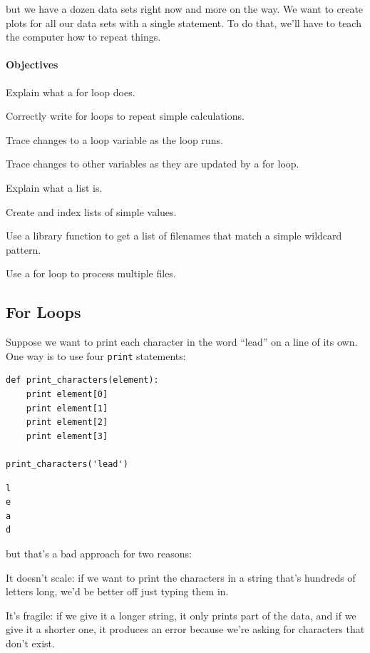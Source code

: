 \documentclass{book}
\begin{document}
but we have a dozen data sets right now and more on the way. We want to
create plots for all our data sets with a single statement. To do that,
we'll have to teach the computer how to repeat things.

\mbox{}\paragraph{Objectives}

\begin{swcitemize}
\item
  Explain what a for loop does.
\item
  Correctly write for loops to repeat simple calculations.
\item
  Trace changes to a loop variable as the loop runs.
\item
  Trace changes to other variables as they are updated by a for loop.
\item
  Explain what a list is.
\item
  Create and index lists of simple values.
\item
  Use a library function to get a list of filenames that match a simple
  wildcard pattern.
\item
  Use a for loop to process multiple files.
\end{swcitemize}

\subsection{For Loops}

Suppose we want to print each character in the word ``lead'' on a line
of its own. One way is to use four \texttt{print} statements:

\begin{verbatim}
def print_characters(element):
    print element[0]
    print element[1]
    print element[2]
    print element[3]

print_characters('lead')
\end{verbatim}

\begin{verbatim}
l
e
a
d
\end{verbatim}

but that's a bad approach for two reasons:

\begin{swcenumerate}
\item
  It doesn't scale: if we want to print the characters in a string
  that's hundreds of letters long, we'd be better off just typing them
  in.
\item
  It's fragile: if we give it a longer string, it only prints part of
  the data, and if we give it a shorter one, it produces an error
  because we're asking for characters that don't exist.
\end{swcenumerate}
\end{document}
